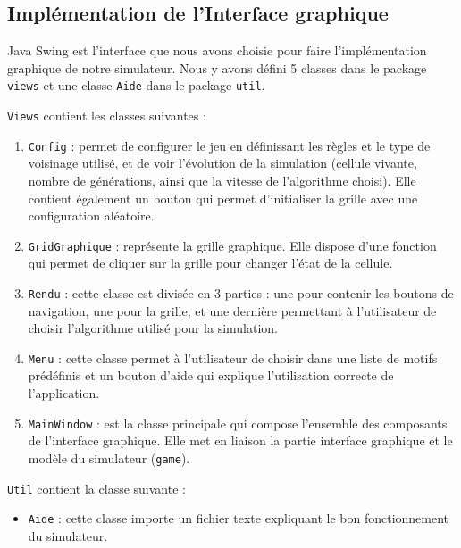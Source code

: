 \subsection{Implémentation de l'Interface graphique}
Java Swing est l'interface que nous avons choisie pour faire l'implémentation graphique de notre simulateur. Nous y avons défini 5 classes dans le package \texttt{views} et une classe \texttt{Aide} dans le package \texttt{util}.

\texttt{Views} contient les classes suivantes :

\begin{enumerate}
\item \texttt{Config} : permet de configurer le jeu en définissant les règles et le type de voisinage utilisé, et de voir l'évolution de la simulation (cellule vivante, nombre de générations, ainsi que la vitesse de l'algorithme choisi). Elle contient également un bouton qui permet d'initialiser la grille avec une configuration aléatoire.
\item \texttt{GridGraphique} : représente la grille graphique. Elle dispose d'une fonction qui permet de cliquer sur la grille pour changer l'état de la cellule.
\item \texttt{Rendu} : cette classe est divisée en 3 parties : une pour contenir les boutons de navigation, une pour la grille, et une dernière permettant à l'utilisateur de choisir l'algorithme utilisé pour la simulation.
\item \texttt{Menu} : cette classe permet à l'utilisateur de choisir dans une liste de motifs prédéfinis et un bouton d'aide qui explique l'utilisation correcte de l'application.
\item \texttt{MainWindow} : est la classe principale qui compose l'ensemble des composants de l'interface graphique. Elle met en liaison la partie interface graphique et le modèle du simulateur (\texttt{game}).
\end{enumerate}

\texttt{Util} contient la classe suivante :

\begin{itemize}
\item \texttt{Aide} : cette classe importe un fichier texte expliquant le bon fonctionnement du simulateur.
\end{itemize}
